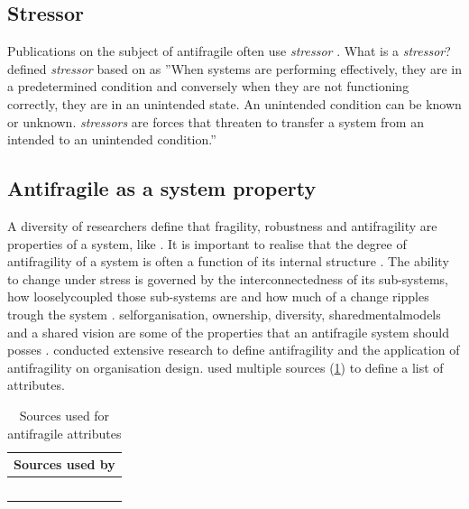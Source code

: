 \subsection{Stressor}
\label{sub:backgroundstressor}
Publications on the subject of \gls{antifragile} often use \textit{\gls{stressor}} \parencite[p.~32]{Botjes2020}. What is a \textit{\gls{stressor}}? \textcite[p.~23]{Ghasemi2017} defined \textit{\gls{stressor}} based on \textcites{TurnerII2003}{Chrousos2009} as ''When systems are performing effectively, they are in a predetermined condition and conversely when they are not functioning correctly, they are in an unintended state. An unintended condition can be known or unknown. \textit{\Glspl{stressor}} are forces that threaten to transfer a system from an intended to an unintended condition.''
\subsection{Antifragile as a system property}
\label{sub:backgroundafpropertyofsystem}
A diversity of researchers define that \gls{fragility}, \gls{robustness} and \gls{antifragility} are properties of a system, like \textcites{Jaaron2014}{Kastner2017}{OReilly2019}{Botjes2021}. It is important to realise that the degree of \gls{antifragility} of a system is often a function of its internal structure \parencite[p.~886]{OReilly2019}. The ability to change under stress is governed by the interconnectedness of its sub-systems, how \gls{looselycoupled} those sub-systems are and how much of a change ripples trough the system \parencites[p.~886]{OReilly2019}[p.~79]{Steen2018}. \Gls{selforganisation}, ownership, \gls{diversity}, \glspl{sharedmentalmodel} and a shared vision are some of the properties that an \gls{antifragile} system should posses \parencites{Jaaron2014}{Hole2016}{Kastner2017}{OReilly2019}{Botjes2021}. \textcite{Botjes2021} conducted extensive research to define \gls{antifragility} and the application of \gls{antifragility} on organisation design. \citeauthor{Botjes2021} used multiple sources (\cref{tab:tbsourcesofantifragileattributes}) to define a list of attributes.
\begin{longtable}{p{}p{}}
	\toprule%
	\multicolumn{2}{c}{\textbf{Sources used by \textcite{Botjes2021}}} \\%
	\midrule%
	\endhead%
	\hline
	\endfoot%
	\caption[Sources used for antifragile attributes]{Sources used for antifragile attributes}
	\label{tab:tbsourcesofantifragileattributes}
	\endlastfoot%
	\textcite{Ghasemi2017} & \textcite{Johnson2013} \\%
	\textcite{Kennon2015} & \textcite{Markey2018} \\%
	\textcite{Hendriksson2016} & \textcite{Kastner2017} \\%
	\textcite{Gorgeon2015} & \textcite{Hole2016} \\%
	\textcite{OReilly2019} & \\%
	\bottomrule%
\end{longtable}
